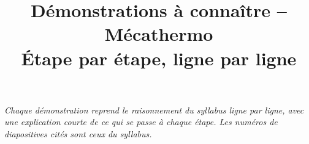 \documentclass[10.5pt,a4paper]{article}
\title{\textbf{Démonstrations à connaître -- Mécathermo}\\[4pt]\large Étape par étape, ligne par ligne}
\author{}
\date{}
\begin{document}
\maketitle
\vspace{-1cm}
\begin{center}
\small\itshape Chaque démonstration reprend le raisonnement du syllabus ligne par ligne, avec une explication
courte de ce qui se passe à chaque étape. Les numéros de diapositives cités sont ceux du syllabus.
\end{center}
\vspace{0.3cm}
\tableofcontents
\newpage


\newpage

\newpage

\newpage

\newpage

\end{document}
